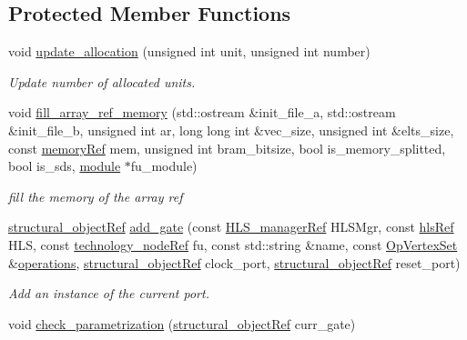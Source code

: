 \subsection*{Protected Member Functions}
\begin{DoxyCompactItemize}
\item 
void \hyperlink{classfu__binding_ae411f4781db5b250a15b49f562290b3e}{update\+\_\+allocation} (unsigned int unit, unsigned int number)
\begin{DoxyCompactList}\small\item\em Update number of allocated units. \end{DoxyCompactList}\item 
void \hyperlink{classfu__binding_ac16197a1e3dd209aee9a4f35b1654d6c}{fill\+\_\+array\+\_\+ref\+\_\+memory} (std\+::ostream \&init\+\_\+file\+\_\+a, std\+::ostream \&init\+\_\+file\+\_\+b, unsigned int ar, long long int \&vec\+\_\+size, unsigned int \&elts\+\_\+size, const \hyperlink{memory_8hpp_aec1333ec6cd561731fb3ed3e55b9caf5}{memory\+Ref} mem, unsigned int bram\+\_\+bitsize, bool is\+\_\+memory\+\_\+splitted, bool is\+\_\+sds, \hyperlink{classmodule}{module} $\ast$fu\+\_\+module)
\begin{DoxyCompactList}\small\item\em fill the memory of the array ref \end{DoxyCompactList}\item 
\hyperlink{structural__objects_8hpp_a8ea5f8cc50ab8f4c31e2751074ff60b2}{structural\+\_\+object\+Ref} \hyperlink{classfu__binding_ab50cb0e1f4ae096856d058f4665636e2}{add\+\_\+gate} (const \hyperlink{hls__manager_8hpp_acd3842b8589fe52c08fc0b2fcc813bfe}{H\+L\+S\+\_\+manager\+Ref} H\+L\+S\+Mgr, const \hyperlink{hls_8hpp_a75d0c73923d0ddfa28c4843a802c73a7}{hls\+Ref} H\+LS, const \hyperlink{technology__node_8hpp_a33dd193b7bd6b987bf0d8a770a819fa7}{technology\+\_\+node\+Ref} fu, const std\+::string \&name, const \hyperlink{classOpVertexSet}{Op\+Vertex\+Set} \&\hyperlink{classfu__binding_a7317a9846ee0032ec80d2c46b015e29f}{operations}, \hyperlink{structural__objects_8hpp_a8ea5f8cc50ab8f4c31e2751074ff60b2}{structural\+\_\+object\+Ref} clock\+\_\+port, \hyperlink{structural__objects_8hpp_a8ea5f8cc50ab8f4c31e2751074ff60b2}{structural\+\_\+object\+Ref} reset\+\_\+port)
\begin{DoxyCompactList}\small\item\em Add an instance of the current port. \end{DoxyCompactList}\item 
void \hyperlink{classfu__binding_acbc4082d95a97e8ce9ca88a46a72999e}{check\+\_\+parametrization} (\hyperlink{structural__objects_8hpp_a8ea5f8cc50ab8f4c31e2751074ff60b2}{structural\+\_\+object\+Ref} curr\+\_\+gate)

\end{DoxyCompactItemize}
